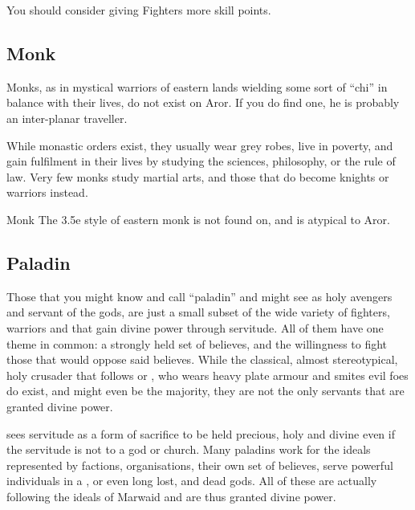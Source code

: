 
\begin{note}
  You should consider giving Fighters more skill points.
\end{note}

\subsection{Monk}
\label{sec:Monk}

Monks, as in mystical warriors of eastern lands wielding some sort of ``chi''
in balance with their lives, do not exist on Aror. If you do find one, he is
probably an inter-planar traveller.

While monastic orders exist, they usually wear grey robes, live in poverty,
and gain fulfilment in their lives by studying the sciences, philosophy, or
the rule of law. Very few monks study martial arts, and those that do become
knights or warriors instead.

\begin{35e}{Monk}
  The 3.5e style of eastern monk is not found on, and is atypical to Aror.
\end{35e}

\subsection{Paladin}
\label{sec:Paladin}

Those that you might know and call ``paladin'' and might see as holy avengers
and servant of the gods, are just a small subset of the wide variety of
fighters, warriors and that gain divine power through servitude. All of them
have one theme in common: a strongly held set of believes, and the willingness
to fight those that would oppose said believes. While the classical, almost
stereotypical, holy crusader that follows  or
, who wears heavy plate armour and smites evil foes do
exist, and might even be the majority, they are not the only servants that are
granted divine power.

 sees servitude as a form of sacrifice to be held
precious, holy and divine even if the servitude is not to a god or church. Many
paladins work for the ideals represented by factions, organisations, their own
set of believes, serve powerful individuals in a , or
even long lost, and dead gods. All of these are actually following the ideals
of Marwaid and are thus granted divine power.

